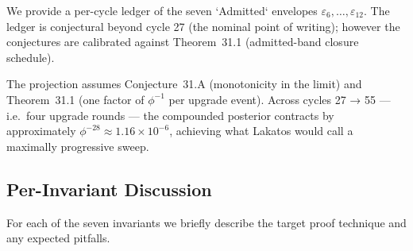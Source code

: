 We provide a per-cycle ledger of the seven `Admitted` envelopes $\varepsilon_{6}, \dots, \varepsilon_{12}$. The ledger is conjectural beyond cycle 27 (the nominal point of writing); however the conjectures are calibrated against Theorem~31.1 (admitted-band closure schedule).

\begin{center}
\end{center}

The projection assumes Conjecture~31.A (monotonicity in the limit) and Theorem~31.1 (one factor of $\phi^{-1}$ per upgrade event). Across cycles 27 → 55 — i.e.\ four upgrade rounds — the compounded posterior contracts by approximately $\phi^{-28} \approx 1.16 \times 10^{-6}$, achieving what Lakatos would call a maximally progressive sweep.

\subsection{Per-Invariant Discussion}
\label{sec:31-per-inv-discussion}

For each of the seven invariants we briefly describe the target proof technique and any expected pitfalls.

